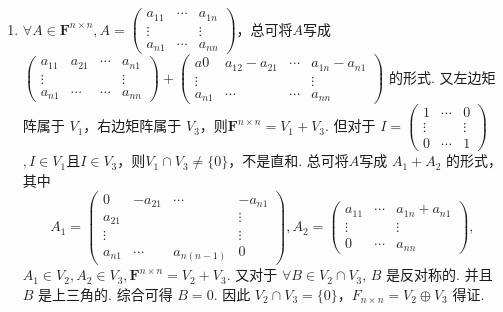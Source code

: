 \begin{exercise}
\begin{exgroup}
\begin{answer}
\begin{enumerate}
            \item $\forall A\in \mathbf{F}^{n\times n},A=\begin{pmatrix}
                          a_{11} & \cdots & a_{1n} \\
                          \vdots &        & \vdots \\
                          a_{n1} & \cdots & a_{nn}
                      \end{pmatrix}$，总可将$A$写成 $\begin{pmatrix}
                          a_{11} & a_{21} & \cdots & a_{n1} \\
                          \vdots &        &        & \vdots \\
                          a_{n1} & \cdots & \cdots & a_{nn}
                      \end{pmatrix}+\begin{pmatrix}
                          a0     & a_{12}-a_{21} & \cdots & a_{1n}-a_{n1} \\
                          \vdots &               &        & \vdots        \\
                          a_{n1} & \cdots        & \cdots & a_{nn}
                      \end{pmatrix}$ 的形式. 又左边矩阵属于 $V_1$，右边矩阵属于 $V_3$，则$\mathbf{F}^{n \times n}=V_1+V_3$. 但对于 $I=\begin{pmatrix}
                          1      & \cdots & 0      \\
                          \vdots &        & \vdots \\
                          0      & \cdots & 1
                      \end{pmatrix} $ $,I \in V_1$且$I \in V_3$，则$V_1\cap V_3\ne\{0\}$，不是直和. 总可将$A$写成 $A_1+A_2$ 的形式，其中
                  \[A_1=\begin{pmatrix}
                          0      & -a_{21} & \cdots     & -a_{n1} \\
                          a_{21} &         &            & \vdots  \\
                          \vdots &         &            & \vdots  \\
                          a_{n1} & \cdots  & a_{n(n-1)} & 0
                      \end{pmatrix},A_2=\begin{pmatrix}
                          a_{11} & \cdots & a_{1n}+a_{n1} \\
                          \vdots &        & \vdots        \\
                          0      & \cdots & a_{nn}
                      \end{pmatrix},\]
                  $A_1\in V_2,A_2\in V_3,\mathbf{F}^{n\times n}=V_2+V_3$. 又对于 $\forall B\in V_2\cap V_3$, $B$ 是反对称的. 并且 $B$ 是上三角的. 综合可得  $B=0$. 因此 $V_2\cap V_3=\{0\}$，$F_{n\times n}=V_2\oplus V_3$ 得证.
        \end{enumerate}
       \end{answer}


\end{exgroup}
\end{exercise}
